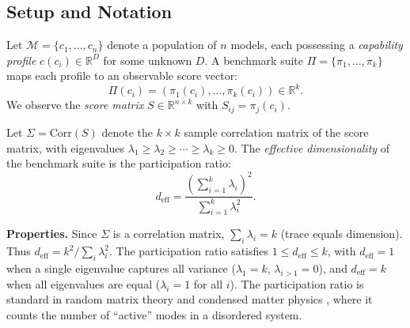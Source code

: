 
\subsection{Setup and Notation}

Let $\mathcal{M} = \{c_1, \ldots, c_n\}$ denote a population of $n$ models, each possessing a \emph{capability profile} $c(c_i) \in \mathbb{R}^D$ for some unknown $D$. A benchmark suite $\Pi = \{\pi_1, \ldots, \pi_k\}$ maps each profile to an observable score vector:
\[
  \Pi(c_i) = (\pi_1(c_i), \ldots, \pi_k(c_i)) \in \mathbb{R}^k.
\]
We observe the \emph{score matrix} $S \in \mathbb{R}^{n \times k}$ with $S_{ij} = \pi_j(c_i)$.

\begin{definition}
Let $\Sigma = \mathrm{Corr}(S)$ denote the $k \times k$ sample correlation matrix of the score matrix, with eigenvalues $\lambda_1 \geq \lambda_2 \geq \cdots \geq \lambda_k \geq 0$. The \emph{effective dimensionality} of the benchmark suite is the participation ratio:
\[
  d_{\mathrm{eff}} = \frac{\left(\sum_{i=1}^k \lambda_i\right)^2}{\sum_{i=1}^k \lambda_i^2}.
\]
\end{definition}

\noindent\textbf{Properties.} Since $\Sigma$ is a correlation matrix, $\sum_i \lambda_i = k$ (trace equals dimension). Thus $d_{\mathrm{eff}} = k^2 / \sum_i \lambda_i^2$. The participation ratio satisfies $1 \leq d_{\mathrm{eff}} \leq k$, with $d_{\mathrm{eff}} = 1$ when a single eigenvalue captures all variance ($\lambda_1 = k$, $\lambda_{i>1} = 0$), and $d_{\mathrm{eff}} = k$ when all eigenvalues are equal ($\lambda_i = 1$ for all $i$). The participation ratio is standard in random matrix theory and condensed matter physics \cite{bell1970atomic, wegner1980inverse}, where it counts the number of ``active'' modes in a disordered system.

